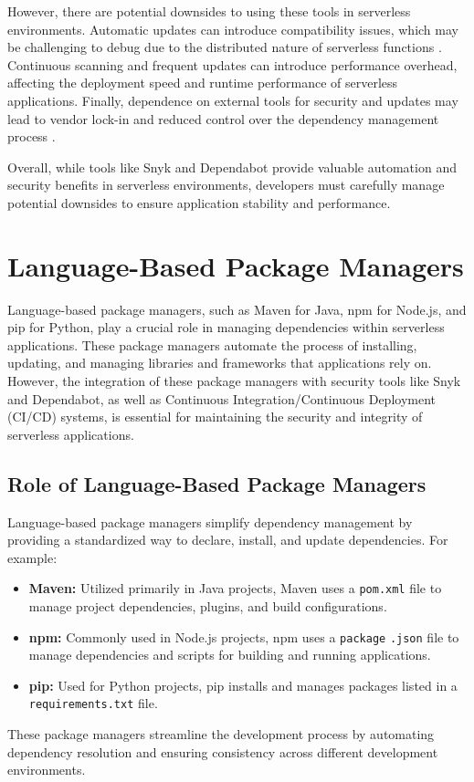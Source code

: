 \documentclass[sigconf]{acmart}
\begin{document}
However, there are potential downsides to using these tools in serverless environments. Automatic updates can introduce compatibility issues, which may be challenging to debug due to the distributed nature of serverless functions \cite{benischke2023updates}. Continuous scanning and frequent updates can introduce performance overhead, affecting the deployment speed and runtime performance of serverless applications. Finally, dependence on external tools for security and updates may lead to vendor lock-in and reduced control over the dependency management process \cite{kavis2014cloud}.

Overall, while tools like Snyk and Dependabot provide valuable automation and security benefits in serverless environments, developers must carefully manage potential downsides to ensure application stability and performance.

\section{Language-Based Package Managers}

Language-based package managers, such as Maven for Java, npm for Node.js, and pip for Python, play a crucial role in managing dependencies within serverless applications. These package managers automate the process of installing, updating, and managing libraries and frameworks that applications rely on. However, the integration of these package managers with security tools like Snyk and Dependabot, as well as Continuous Integration/Continuous Deployment (CI/CD) systems, is essential for maintaining the security and integrity of serverless applications.

\subsection{Role of Language-Based Package Managers}

Language-based package managers simplify dependency management by providing a standardized way to declare, install, and update dependencies. For example:
\begin{itemize}
    \item \textbf{Maven:} Utilized primarily in Java projects, Maven uses a \texttt{pom.xml} file to manage project dependencies, plugins, and build configurations.
    \item \textbf{npm:} Commonly used in Node.js projects, npm uses a \texttt{package} \texttt{.json} file to manage dependencies and scripts for building and running applications.
    \item \textbf{pip:} Used for Python projects, pip installs and manages packages listed in a \texttt{requirements.txt} file.
\end{itemize}
These package managers streamline the development process by automating dependency resolution and ensuring consistency across different development environments.
\end{document}
